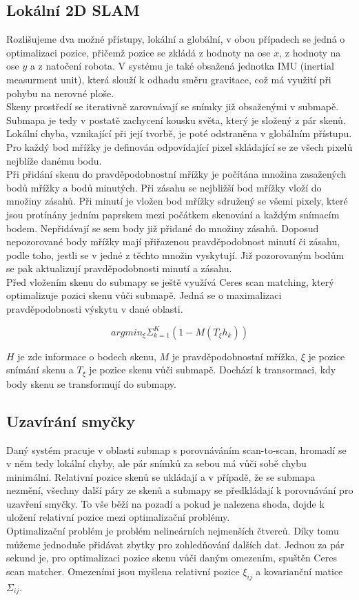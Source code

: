 \documentclass[11pt]{article}
\begin{document}
\subsection{Lokální 2D SLAM}
Rozlišujeme dva možné přístupy, lokální a globální, v obou případech se jedná o optimalizaci pozice, přičemž pozice se zkládá z hodnoty na ose $x$, z hodnoty na ose $y$ a z natočení robota. V systému je také obsažená jednotka IMU (inertial measurment unit), která slouží k odhadu směru gravitace, což má využití při pohybu na nerovné ploše.\\
\indent Skeny prostředí se iterativně zarovnávají se snímky již obsaženými v submapě. Submapa je tedy v postatě zachycení kousku světa, který je složený z pár skenů. Lokální chyba, vznikající při její tvorbě, je poté odstraněna v globálním přístupu. Pro každý bod mřížky je definován odpovídající pixel skládající se ze všech pixelů nejblíže danému bodu.\\
\indent Při přidání skenu do pravděpodobnostní mřížky je počítána množina zasažených bodů mřížky a bodů minutých. Při zásahu se nejbližší bod mřížky vloží do množiny zásahů. Při minutí je vložen bod mřížky sdružený se všemi pixely, které jsou protínány jedním paprskem mezi počátkem skenování a každým snímacím bodem. Nepřidávají se sem body již přidané do množiny zásahů. Doposud nepozorované body mřížky mají přiřazenou pravděpodobnost minutí či zásahu, podle toho, jestli se v jedné z těchto množin vyskytují. Již pozorovaným bodům se pak aktualizují pravděpodobnosti minutí a zásahu.\\
\indent Před vložením skenu do submapy se ještě využívá Ceres scan matching, který optimalizuje pozici skenu vůči submapě. Jedná se o maximalizaci pravděpodobnosti výskytu v dané oblasti.  

\begin{equation}
	argmin_\xi\Sigma^K_{k=1}(1-M(T_{\xi}h_k))
\end{equation}

$H$ je zde informace o bodech skenu, $M$ je pravděpodobnostní mřížka, $\xi$ je pozice snímání skenu a $T_{\xi}$ je pozice skenu vůči submapě. Dochází k transormaci, kdy body skenu se transformují do submapy.

\subsection{Uzavírání smyčky}
Daný systém pracuje v oblasti submap s porovnáváním scan-to-scan, hromadí se v něm tedy lokální chyby, ale pár snímků za sebou má vůči sobě chybu minimální. Relativní pozice skenů se ukládají a v případě, že se submapa nezmění, všechny další páry ze skenů a submapy se předkládají k porovnávání pro uzavření smyčky. To vše běží na pozadí a pokud je nalezena shoda, dojde k uložení relativní pozice mezi optimalizační problémy.\\
\indent Optimalizační problém je problém nelineárních nejmenších čtverců. Díky tomu můžeme jednoduše přidávat zbytky pro zohledňování dalších dat. Jednou za pár sekund je, pro optimalizaci pozice skenu vůči daným omezením, spuštěn Ceres scan matcher. Omezeními jsou myšlena relativní pozice $\xi_{ij}$ a kovarianční matice $\Sigma_{ij}$.
\end{document}
